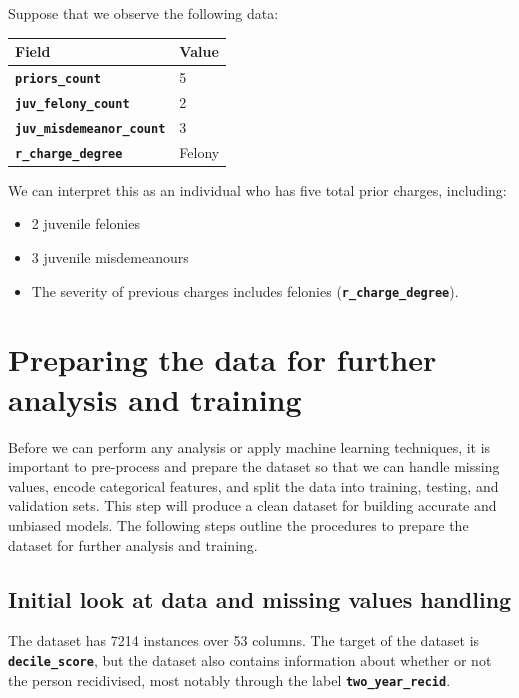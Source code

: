 \documentclass[conference]{IEEEtran}
\begin{document}
	Suppose that we observe the following data:
	
	\begin{table}[!ht]
		\centering
		\begin{tabular}{|l|l|}
			\hline
			Field & Value \\ \hline
			\textbf{\texttt{priors\_count}} & 5 \\ \hline
			\textbf{\texttt{juv\_felony\_count}} & 2 \\ \hline
			\textbf{\texttt{juv\_misdemeanor\_count}} & 3 \\ \hline
			\textbf{\texttt{r\_charge\_degree}} & Felony \\ \hline
		\end{tabular}
	\end{table}
	
	We can interpret this as an individual who has five total prior charges, including:
	
	\begin{itemize}
		\item 2 juvenile felonies
		\item 3 juvenile misdemeanours
		\item The severity of previous charges includes felonies (\textbf{\texttt{r\_charge\_degree}}).
	\end{itemize}
	

	\section{Preparing the data for further analysis and training}
	
	Before we can perform any analysis or apply machine learning techniques, it is important to pre-process and prepare the dataset so that we can handle missing values, encode categorical features, and split the data into training, testing, and validation sets. This step will produce a clean dataset for building accurate and unbiased models. The following steps outline the procedures to prepare the dataset for further analysis and training.

	
	\subsection{Initial look at data and missing values handling}
	
	The dataset has 7214 instances over 53 columns. The target of the dataset is \textbf{\texttt{decile\_score}}, but the dataset also contains information about whether or not the person recidivised, most notably through the label \textbf{\texttt{two\_year\_recid}}. 
	
\end{document}

